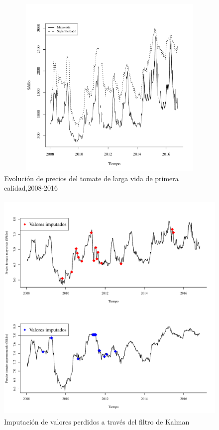 \documentclass[12pt, twoside]{book}\usepackage[]{graphicx}\usepackage[]{color}
\newenvironment{knitrout}{}{} %
\numberwithin{equation}{section}
\numberwithin{theorem}{section}
\numberwithin{teorema}{section}
\numberwithin{defi}{section}
\numberwithin{prop}{section}
\numberwithin{defi}{section}
\theoremstyle{plain}
\begin{document}
\begin{knitrout}
\color{fgcolor}\begin{figure}[H]

{\centering \includegraphics[width=6.5in,height=3.5in]{figure/fig-1-1} 

}

\caption[Evolución de precios del tomate de larga vida de primera calidad,2008-2016]{Evolución de precios del tomate de larga vida de primera calidad,2008-2016}\label{fig:fig-1}
\end{figure}


\end{knitrout}


\begin{knitrout}
\color{fgcolor}\begin{figure}[H]

{\centering \includegraphics[width=6.5in,height=4.5in]{figure/fig-2-1} 

}

\caption[Imputación de valores perdidos a través del filtro de Kalman]{Imputación de valores perdidos a través del filtro de Kalman}\label{fig:fig-2}
\end{figure}


\end{knitrout}
\end{document}
